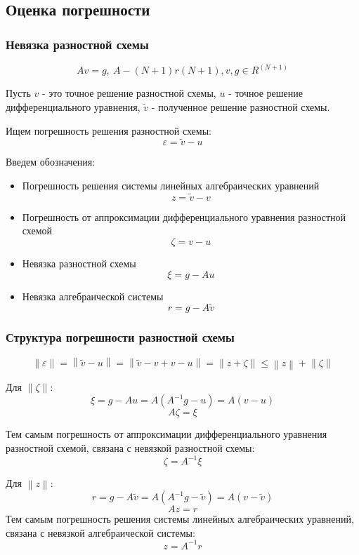 \subsection{Оценка погрешности}

\subsubsection{Невязка разностной схемы}

\[
  Av = g,\ A - (N + 1) r (N + 1), v, g \in R^{(N + 1)}
\]

Пусть $ v $ - это точное решение разностной схемы, $ u $ -  точное решение дифференциального уравнения, 
$ \tilde{v} $ - полученное решение разностной схемы.

Ищем погрешность решения разностной схемы:
\[
  \varepsilon = \tilde{v} - u
\]

Введем обозначения:
\begin{itemize}
  \item Погрешность решения системы линейных алгебраических уравнений
  \[ z = \tilde{v} - v \]
  \item Погрешность от аппроксимации дифференциального уравнения разностной схемой
  \[ \zeta = v - u \]
  \item Невязка разностной схемы
  \[ \xi = g - Au \]
  \item Невязка алгебраической системы
  \[ r = g - A\tilde{v} \]
\end{itemize}

\subsubsection{Структура погрешности разностной схемы}
\[
  \left\lVert \varepsilon \right\rVert = \left\lVert \tilde{v} - u \right\rVert =
  \left\lVert \tilde{v} - v + v - u \right\rVert = \left\lVert z + \zeta  \right\rVert \leq \left\lVert z \right\rVert
  + \left\lVert \zeta \right\rVert 
\]

Для $\left\lVert \zeta\right\rVert$:
\[
  \xi = g - Au = A(A^{-1}g - u) = A(v - u)
\]
\[
  A\zeta  = \xi
\]

Тем самым погрешность от аппроксимации дифференциального уравнения разностной схемой, связана с невязкой разностной схемы:
\[
  \zeta = A^{-1} \xi 
\]

Для $\left\lVert z \right\rVert$:
\[
  r = g - A\tilde{v} = A(A^{-1}g - \tilde{v}) = A(v - \tilde{v})
\]
\[
  Az = r
\]
Тем самым погрешность решения системы линейных алгебраических уравнений, связана с невязкой алгебраической системы:
\[
  z = A^{-1}r
\]

